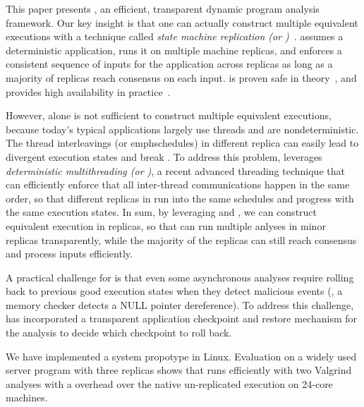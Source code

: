 This paper presents \xxx, an efficient, transparent dynamic program analysis 
framework. Our key insight is that one can actually construct multiple 
equivalent executions with a technique called \emph{state machine replication 
(or \smr)}~\cite{paxos:simple, paxos:practical}. assumes a deterministic 
application, runs it on multiple machine replicas, and enforces a consistent 
sequence of inputs for the application across replicas as long as a majority of 
replicas reach consensus on each input. \smr is proven safe in 
theory~\cite{paxos}, and provides high availability in 
practice~\cite{chubby:osdi, zookeeper}.

However, \smr alone is not sufficient to construct multiple equivalent 
executions, because today's typical applications largely use threads and are 
nondeterministic. The thread interleavings (or emph{schedules}) in different 
replica can easily lead to divergent execution states and break \smr. To 
address this problem, \xxx leverages \emph{deterministic multithreading (or 
\dmt)}, a recent advanced threading technique that can efficiently enforce that 
all inter-thread communications happen in the same order, so that different 
replicas in \smr run into the same schedules and progress with the same 
execution states. In sum, by leveraging \smr and \dmt, we can construct 
equivalent execution in replicas, so that \xxx can run multiple anlyses in 
minor replicas transparently, while the majority of the replicas can still 
reach consensus and process inputs efficiently.


A practical challenge for \xxx is that even some asynchronous analyses require 
rolling back to previous good execution states when they detect malicious 
events (\eg, a memory checker detects a NULL pointer dereference). To address 
this challenge, \xxx has incorporated a transparent application checkpoint and restore mechanism for the analysis to decide which checkpoint to roll back.


We have implemented a \xxx system propotype in Linux. Evaluation on a widely 
used server program \clamav with three replicas shows that \xxx runs 
efficiently with two Valgrind analyses with a overhead \overhead over the native 
un-replicated execution on 24-core machines.


